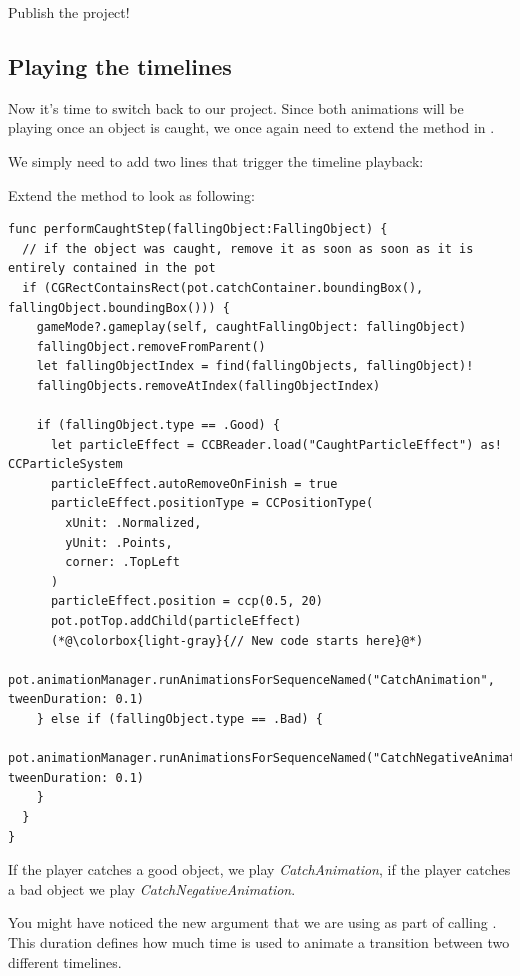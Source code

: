 \begin{leftbar}
Publish the \SB{} project!
\end{leftbar}

\subsection{Playing the timelines}
Now it's time to switch back to our \xcode{} project. Since both animations
will be playing once an object is caught, we once again need to extend the
 method in
.

We simply need to add two lines that trigger the timeline playback:
\begin{leftbar}
Extend the  method to look as
following:
\begin{lstlisting}
func performCaughtStep(fallingObject:FallingObject) {
  // if the object was caught, remove it as soon as soon as it is entirely contained in the pot
  if (CGRectContainsRect(pot.catchContainer.boundingBox(), fallingObject.boundingBox())) {
    gameMode?.gameplay(self, caughtFallingObject: fallingObject)
    fallingObject.removeFromParent()
    let fallingObjectIndex = find(fallingObjects, fallingObject)!
    fallingObjects.removeAtIndex(fallingObjectIndex)
    
    if (fallingObject.type == .Good) {
      let particleEffect = CCBReader.load("CaughtParticleEffect") as! CCParticleSystem
      particleEffect.autoRemoveOnFinish = true
      particleEffect.positionType = CCPositionType(
        xUnit: .Normalized,
        yUnit: .Points,
        corner: .TopLeft
      )
      particleEffect.position = ccp(0.5, 20)
      pot.potTop.addChild(particleEffect)
      (*@\colorbox{light-gray}{// New code starts here}@*)
      pot.animationManager.runAnimationsForSequenceNamed("CatchAnimation", tweenDuration: 0.1)
    } else if (fallingObject.type == .Bad) {
      pot.animationManager.runAnimationsForSequenceNamed("CatchNegativeAnimation", tweenDuration: 0.1)
    }
  }
}
\end{lstlisting}
\end{leftbar}

If the player catches a good object, we play \textit{CatchAnimation}, if the
player catches a bad object we play \textit{CatchNegativeAnimation}.

You might have noticed the new  argument that we are
using as part of calling . This
duration defines how much time is used to animate a transition between two
different timelines.

